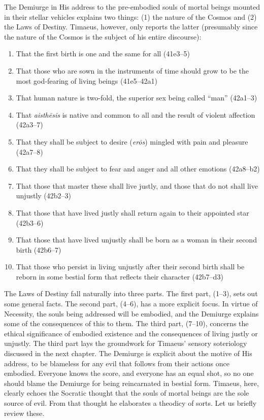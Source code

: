 The Demiurge in His address to the pre-embodied souls of mortal beings mounted in their stellar vehicles explains two things: (1) the nature of the Cosmos and (2) the Laws of Destiny. Timaeus, however, only reports the latter (presumably since the nature of the Cosmos is the subject of his entire discourse):
\begin{enumerate}[(1)]
	\item That the first birth is one and the same for all (41e3--5)
	\item That those who are sown in the instruments of time should grow to be the most god-fearing of living beings (41e5--42a1)
	\item That human nature is two-fold, the superior sex being called ``man'' (42a1--3)
	\item That \emph{aisthēsis} is native and common to all and the result of violent affection (42a3--7)
	\item That they shall be subject to desire (\emph{erōs}) mingled with pain and pleasure (42a7--8)
	\item That they shall be subject to fear and anger and all other emotions (42a8--b2)
	\item That those that master these shall live justly, and those that do not shall live unjustly (42b2--3)
	\item That those that have lived justly shall return again to their appointed star (42b3--6)
	\item That those that have lived unjustly shall be born as a woman in their second birth (42b6--7)
	\item That those who persist in living unjustly after their second birth shall be reborn in some bestial form that reflects their character (42b7--d3)
\end{enumerate}
The Laws of Destiny fall naturally into three parts. The first part, (1--3), sets out some general facts. The second part, (4--6), has a more explicit focus. In virtue of Necessity, the souls being addressed will be embodied, and the Demiurge explains some of the consequences of this to them. The third part, (7--10), concerns the ethical significance of embodied existence and the consequences of living justly or unjustly. The third part lays the groundwork for Timaeus' sensory soteriology discussed in the next chapter. The Demiurge is explicit about the motive of His address, to be blameless for any evil that follows from their actions once embodied. Everyone knows the score, and everyone has an equal shot, so no one should blame the Demiurge for being reincarnated in bestial form. Timaeus, here, clearly echoes the Socratic thought that the souls of mortal beings are the sole source of evil. From that thought he elaborates a theodicy of sorts. Let us briefly review these.

